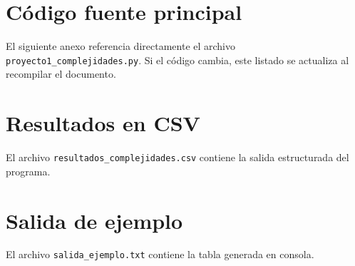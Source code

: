 \documentclass[12pt,letterpaper]{article}
\begin{document}
\appendix

\section{Código fuente principal}

El siguiente anexo referencia directamente el archivo \texttt{proyecto1\_complejidades.py}. Si el código cambia, este listado se actualiza al recompilar el documento.



\section{Resultados en CSV}

El archivo \texttt{resultados\_complejidades.csv} contiene la salida estructurada del programa.



\section{Salida de ejemplo}

El archivo \texttt{salida\_ejemplo.txt} contiene la tabla generada en consola.


\end{document}
